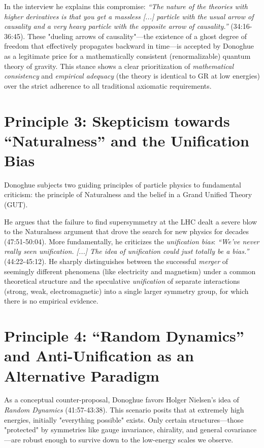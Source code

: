 	In the interview he explains this compromise: \emph{``The nature of the theories with higher derivatives is that you get a massless [...] particle with the usual arrow of causality and a very heavy particle with the opposite arrow of causality.''} \cite{DonoghueInterview2025} (34:16-36:45). These "dueling arrows of causality"—the existence of a ghost degree of freedom that effectively propagates backward in time—is accepted by Donoghue as a legitimate price for a mathematically consistent (renormalizable) quantum theory of gravity. This stance shows a clear prioritization of \emph{mathematical consistency} and \emph{empirical adequacy} (the theory is identical to GR at low energies) over the strict adherence to all traditional axiomatic requirements.
	
	\section{Principle 3: Skepticism towards ``Naturalness'' and the Unification Bias}
	
	Donoghue subjects two guiding principles of particle physics to fundamental criticism: the principle of Naturalness and the belief in a Grand Unified Theory (GUT).
	
	He argues that the failure to find supersymmetry at the LHC dealt a severe blow to the Naturalness argument that drove the search for new physics for decades \cite{DonoghueInterview2025} (47:51-50:04). More fundamentally, he criticizes the \emph{unification bias}: \emph{``We've never really seen unification. [...] The idea of unification could just totally be a bias.''} \cite{DonoghueInterview2025} (44:22-45:12). He sharply distinguishes between the successful \emph{merger} of seemingly different phenomena (like electricity and magnetism) under a common theoretical structure and the speculative \emph{unification} of separate interactions (strong, weak, electromagnetic) into a single larger symmetry group, for which there is no empirical evidence.
	
	\section{Principle 4: ``Random Dynamics'' and Anti-Unification as an Alternative Paradigm}
	
	As a conceptual counter-proposal, Donoghue favors Holger Nielsen's idea of \emph{Random Dynamics} \cite{DonoghueInterview2025} (41:57-43:38). This scenario posits that at extremely high energies, initially "everything possible" exists. Only certain structures—those "protected" by symmetries like gauge invariance, chirality, and general covariance—are robust enough to survive down to the low-energy scales we observe.
	
